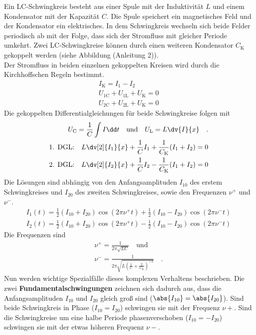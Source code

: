 Ein LC-Schwingkreis besteht aus einer Spule mit der Induktivität $L$ und einem Kondensator mit der Kapazität $C$. Die Spule speichert ein magnetisches Feld und der Kondensator ein elektrisches. In dem Schwingkreis wechseln sich beide Felder periodisch ab mit der Folge, dass sich der Stromfluss  mit gleicher Periode umkehrt. Zwei LC-Schwingkreise können durch einen weiteren Kondensator $C_\text{K}$ gekoppelt werden (siehe Abbildung (Anleitung 2)). \\
Der Stromfluss in beiden einzelnen gekoppelten Kreisen wird durch die Kirchhoffschen Regeln bestimmt.
\begin{align}
I_\text{K} = I_\text{1}-I_\text{2} \\
U_\text{1C} + U_\text{1L} + U_\text{K} = 0 \\
U_\text{2C} + U_\text{2L} + U_\text{K} = 0
\end{align}
Die gekoppelten Differentialgleichungen für beide Schwingkreise folgen mit
\begin{align}
U_\text{C} = \frac{1}{C} \int I \dd t \quad \text{und} \quad U_\text{L} = L \dv{I}{x} \quad .  \\
\text{1. DGL:} \quad L \dv[2]{I_1}{x} + \frac{1}{C} I_1 + \frac{1}{C_\text{K}}(I_1 + I_2) = 0 \\
\text{2. DGL:} \quad L \dv[2]{I_2}{x} + \frac{1}{C} I_2 - \frac{1}{C_\text{K}} (I_1 + I_2) = 0
\end{align}
Die Lösungen sind abhängig von den Anfangsamplituden $I_{10}$ des erstem Schwingkreises und $I_{20}$ des zweiten Schwingkreises, sowie den Frequenzen $\nu^{+}$ und $\nu^{-} $.
\begin{align}
I_1(t) = \frac{1}{2}(I_{10} + I_{20}) \cos(2 \pi \nu^+ t) + \frac{1}{2}(I_{10} - I_{20}) \cos(2 \pi \nu^- t) \\
I_2(t) = \frac{1}{2}(I_{10} + I_{20}) \cos(2 \pi \nu^+ t) - \frac{1}{2}(I_{10} - I_{20}) \cos(2 \pi \nu^- t)
\end{align}
Die Frequenzen sind
\begin{align}
\nu^+ = \frac{1}{2 \pi \sqrt{L C}} \quad \text{und} \label{Frequenz_p} \\
\nu^- = \frac{1}{2 \pi \sqrt{L\left(\frac{1}{C} + \frac{2}{C_\text{K}}\right)^{-1}}} \quad . \label{Frequenz_m}
\end{align}
Nun werden wichtige Spezialfälle dieses komplexen Verhaltens beschrieben. Die zwei \textbf{Fundamentalschwingungen} zeichnen sich dadurch aus, dass die Anfangsamplituden $I_{10}$ und $I_{20}$ gleich groß sind ($\abs{I_{10}} = \abs{I_{20}}$). Sind beide Schwingkreis in Phase ($I_{10}=I_{20}$) schwingen sie mit der Frequenz $\nu+$. Sind die Schwingkreise um eine halbe Periode phasenverschoben ($I_{10} = - I_{20}$) schwingen sie mit der etwas höheren Frequenz $\nu-$. \\
